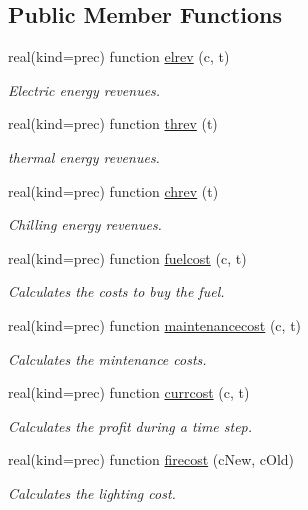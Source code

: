 \subsection*{Public Member Functions}
\begin{DoxyCompactItemize}
\item 
real(kind=prec) function \hyperlink{classeconomy_a4ab4325ba4da5a36bfc71dad24b101c6}{elrev} (c, t)
\begin{DoxyCompactList}\small\item\em Electric energy revenues. \end{DoxyCompactList}\item 
real(kind=prec) function \hyperlink{classeconomy_a5f12114d9d3d02f2d9590df75c787003}{threv} (t)
\begin{DoxyCompactList}\small\item\em thermal energy revenues. \end{DoxyCompactList}\item 
real(kind=prec) function \hyperlink{classeconomy_af1f82a2c63a713af1676de7fb05aadc5}{chrev} (t)
\begin{DoxyCompactList}\small\item\em Chilling energy revenues. \end{DoxyCompactList}\item 
real(kind=prec) function \hyperlink{classeconomy_aa8f3af6fe0e525bc72f54bf369789443}{fuelcost} (c, t)
\begin{DoxyCompactList}\small\item\em Calculates the costs to buy the fuel. \end{DoxyCompactList}\item 
real(kind=prec) function \hyperlink{classeconomy_af6ed48a60d50c438efa98f16deed7520}{maintenancecost} (c, t)
\begin{DoxyCompactList}\small\item\em Calculates the mintenance costs. \end{DoxyCompactList}\item 
real(kind=prec) function \hyperlink{classeconomy_a542c71f53d112855d6a81bf21941c8a9}{currcost} (c, t)
\begin{DoxyCompactList}\small\item\em Calculates the profit during a time step. \end{DoxyCompactList}\item 
real(kind=prec) function \hyperlink{classeconomy_ace504d2735fcf5bab047994e760346a9}{firecost} (c\-New, c\-Old)
\begin{DoxyCompactList}\small\item\em Calculates the lighting cost. \end{DoxyCompactList}\item 

\end{DoxyCompactItemize}
